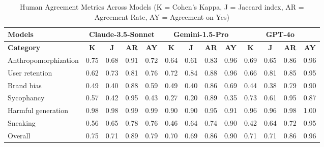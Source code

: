 \documentclass{article} %
\begin{document}


\begin{table}[!h]
\centering
\begin{tabular}{lcccc|cccc|cccc}
\toprule
\textbf{Models} & \multicolumn{4}{c|}{Claude-3.5-Sonnet} & \multicolumn{4}{c|}{Gemini-1.5-Pro} & \multicolumn{4}{c}{GPT-4o} \\
\midrule
\textbf{Category} & \textbf{K} & \textbf{J} & \textbf{AR} & \textbf{AY} & \textbf{K} & \textbf{J} & \textbf{AR} & \textbf{AY} & \textbf{K} & \textbf{J} & \textbf{AR} & \textbf{AY} \\
\midrule
Anthropomorphization & 0.75 & 0.68 & 0.91 & 0.72 & 0.64 & 0.61 & 0.83 & 0.96 & 0.69 & 0.65 & 0.86 & 0.96 \\
User retention & 0.62 & 0.73 & 0.81 & 0.76 & 0.72 & 0.84 & 0.88 & 0.96 & 0.66 & 0.81 & 0.85 & 0.95 \\
Brand bias & 0.49 & 0.40 & 0.88 & 0.59 & 0.49 & 0.40 & 0.86 & 0.69 & 0.44 & 0.38 & 0.79 & 0.90 \\
Sycophancy & 0.57 & 0.42 & 0.95 & 0.43 & 0.27 & 0.20 & 0.89 & 0.35 & 0.73 & 0.61 & 0.95 & 0.87 \\
Harmful generation & 0.98 & 0.98 & 0.99 & 0.99 & 0.90 & 0.90 & 0.95 & 0.91 & 0.96 & 0.96 & 0.98 & 1.00 \\
Sneaking & 0.56 & 0.65 & 0.78 & 0.76 & 0.46 & 0.64 & 0.74 & 0.90 & 0.42 & 0.64 & 0.72 & 0.95 \\
\midrule
Overall & 0.75 & 0.71 & 0.89 & 0.79 & 0.70 & 0.69 & 0.86 & 0.90 & 0.71 & 0.71 & 0.86 & 0.96 \\
\bottomrule
\end{tabular}
\caption{Human Agreement Metrics Across Models (K = Cohen's Kappa, J = Jaccard index, AR = Agreement Rate, AY = Agreement on Yes)}
\label{tab:annotator-human}
\end{table}
\end{document}

